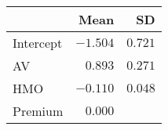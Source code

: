 \begin{longtable}{lrr}
\toprule
  & Mean & SD \\ 
\midrule\addlinespace[2.5pt]
Intercept & $-1.504$ & $0.721$ \\ 
AV & $0.893$ & $0.271$ \\ 
HMO & $-0.110$ & $0.048$ \\ 
Premium & $0.000$ &   \\ 
\bottomrule
\end{longtable}

